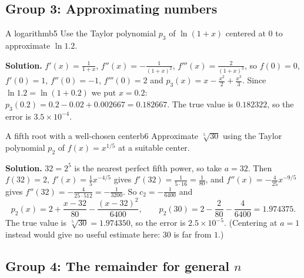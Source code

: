 \documentclass[11pt]{article}
\begin{document}
\subsection*{Group 3: Approximating numbers}

\begin{exmp}{A logarithm}{b5}
Use the Taylor polynomial $p_3$ of $\ln(1+x)$ centered at $0$ to approximate $\ln1.2$.

\textbf{Solution.} $f'(x)=\frac1{1+x}$, $f''(x)=-\frac1{(1+x)^2}$, $f'''(x)=\frac2{(1+x)^3}$, so $f(0)=0$, $f'(0)=1$, $f''(0)=-1$, $f'''(0)=2$ and $p_3(x)=x-\frac{x^2}2+\frac{x^3}3$. Since $\ln1.2=\ln(1+0.2)$ we put $x=0.2$: $p_3(0.2)=0.2-0.02+0.002667=0.182667$. The true value is $0.182322$, so the error is $3.5\times10^{-4}$.
\end{exmp}

\begin{exmp}{A fifth root with a well-chosen center}{b6}
Approximate $\sqrt[5]{30}$ using the Taylor polynomial $p_2$ of $f(x)=x^{1/5}$ at a suitable center.

\textbf{Solution.} $32=2^5$ is the nearest perfect fifth power, so take $a=32$. Then $f(32)=2$, $f'(x)=\frac15x^{-4/5}$ gives $f'(32)=\frac1{5\cdot16}=\frac1{80}$, and $f''(x)=-\frac4{25}x^{-9/5}$ gives $f''(32)=-\frac4{25\cdot512}=-\frac1{3200}$. So $c_2=-\frac1{6400}$ and
\[
p_2(x)=2+\frac{x-32}{80}-\frac{(x-32)^2}{6400},\qquad p_2(30)=2-\frac2{80}-\frac4{6400}=1.974375 .
\]
The true value is $\sqrt[5]{30}=1.974350$, so the error is $2.5\times10^{-5}$. (Centering at $a=1$ instead would give no useful estimate here: $30$ is far from $1$.)
\end{exmp}

\subsection*{Group 4: The remainder for general $n$}
\end{document}
